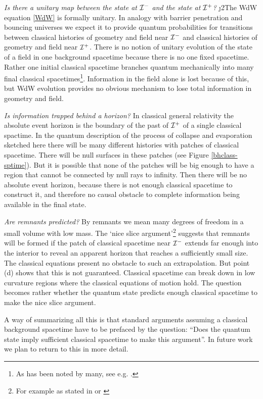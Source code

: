\documentclass[prd,floats,superscriptaddress,eqsecnum,floatfix,nofootinbib,12pt]{revtex4}
\def\scrip{{\cal I}^+}
\def\scrim{{\cal I}^-}
\def\scrim{{\cal I}^-}
\def\j2{}
\def\tf{}
\begin{document}
{{{{{\it Is there a unitary map between the state at $\scrim$ and the state at $\scrip$?} {\j2The WdW equation \eqref{WdW} is formally unitary. In analogy with barrier penetration and bouncing universes we expect it to provide quantum probabilities for transitions between classical histories of geometry and field near $\scrim$ and classical histories of geometry and field near $\scrip$. There is no notion of unitary evolution of the state of a  field in one background spacetime because there is no one fixed spacetime. Rather one initial classical spacetime branches quantum mechanically into many final classical spacetimes\footnote{As has been noted by many, see e.g. \cite{1intomany}.}. Information in the field alone is lost because of this, but WdW evolution provides no obvious mechanism to lose total information in geometry and field.}

{\it Is information trapped behind a horizon?}  {\tf In classical general relativity the absolute event horizon is the boundary of the past of $\scrip$ {\tf of a single classical spactime.} In the quantum description of the process of collapse and evaporation sketched  here there will  be many different histories with patches of classical spacetime. There will be null surfaces in these patches (see Figure \ref{bhclass-sptime}).  But it is  possible that none of the patches will be big enough to have a region that cannot be connected by null rays to infinity. Then there will be no absolute event horizon, because there is not enough classical spacetime to construct it, and therefore no causal obstacle to complete information being available in the final state. }  

{\it Are remnants predicted?}  By remnants we mean many degrees of freedom in a small volume with low mass. The `nice slice argument'\footnote{For example as stated in \cite{Giddings07} or \cite{Pol95}} suggests that remnants will be formed if the patch of classical spacetime near $\scrim$ extends far enough into the interior to reveal an apparent horizon that reaches a sufficiently small size. The classical equations present no obstacle to such an extrapolation. But point (d) shows that this is not guaranteed. Classical spacetime can break down in low curvature regions where the classical equations of motion hold. The question becomes rather whether the quantum state predicts enough classical spacetime to make the nice slice argument. 

A way of summarizing all this is that standard arguments assuming a classical background spacetime have to be prefaced by the question: ``Does the quantum state imply sufficient classical spacetime to make this argument''. In future work we plan to return to this in more detail.

}}}}
\end{document}
